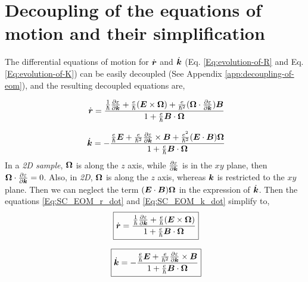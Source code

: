 \documentclass{report}
\renewcommand\vec[1]{\ensuremath\boldsymbol{#1}} %
\begin{document}
\chapter{Decoupling of the equations of motion and their simplification}

The differential equations of motion for $\dot{\vec{r}}$ and $\dot{\vec{k}}$ (Eq. \ref{Eq:evolution-of-R} and Eq. \ref{Eq:evolution-of-K}) can be easily decoupled (See Appendix \ref{app:decoupling-of-eom}), and the resulting decoupled equations are,

\begin{equation}~\label{Eq:SC_EOM_r_dot}
	\dot{\vec{r}} = \frac{\frac{1}{\hbar} \frac{\partial \varepsilon}{\partial \vec{k}} + \frac{e}{\hbar} (\vec{E}\times\vec{\Omega}) + \frac{e}{\hbar^2} (\vec{\Omega} \cdot \frac{\partial \varepsilon}{\partial \vec{k}} )\vec{B}}{1 + \frac{e}{\hbar} \vec{B}\cdot\vec{\Omega}}
\end{equation}

\begin{equation}~\label{Eq:SC_EOM_k_dot}
	\dot{\vec{k}} = -\frac{\frac{e}{\hbar} \vec{E} +\frac{e}{\hbar^2} \frac{\partial \varepsilon}{\partial \vec{k}} \times \vec{B} + \frac{e^2}{\hbar^2} (\vec{E}\cdot\vec{B}) \vec{\Omega}}{1 + \frac{e}{\hbar} \vec{B}\cdot\vec{\Omega}}
\end{equation}
In a \textit{2D sample}, $\vec{\Omega}$ is along the $z$ axis, while $\frac{\partial \varepsilon}{\partial \vec{k}}$ is in the $xy$ plane, then $\vec{\Omega} \cdot \frac{\partial \varepsilon}{\partial \vec{k}} = 0$. Also, in \textit{2D}, $\vec{\Omega}$ is along the $z$ axis, whereas $\vec{k}$ is restricted to the $xy$ plane. Then we can neglect the term $(\vec{E}\cdot\vec{B}) \vec{\Omega}$ in the expression of $\dot{\vec{k}}$.
Then the equations \eqref{Eq:SC_EOM_r_dot} and \eqref{Eq:SC_EOM_k_dot} simplify to,
\begin{equation}~\label{Eq:SC_EOM_r_dot_decoupled}
	\boxed{\dot{\vec{r}} = \frac{\frac{1}{\hbar} \frac{\partial \varepsilon}{\partial \vec{k}} + \frac{e}{\hbar} (\vec{E}\times\vec{\Omega})}{1 + \frac{e}{\hbar} \vec{B}\cdot\vec{\Omega}}}
\end{equation}

\begin{equation}~\label{Eq:SC_EOM_k_dot_decoupled}
	\boxed{\dot{\vec{k}} = -\frac{\frac{e}{\hbar} \vec{E} +\frac{e}{\hbar^2} \frac{\partial \varepsilon}{\partial \vec{k}} \times \vec{B}}{1 + \frac{e}{\hbar} \vec{B}\cdot\vec{\Omega}}}
\end{equation}
\end{document}
